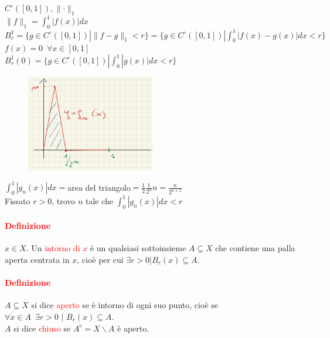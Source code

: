 \documentclass{article}
\begin{document}
$C^\circ([0,1]),\parallel\cdot\parallel_1$\\
$\parallel f\parallel_1=\int_{0}^{1}|f(x)|dx$\\
$B_r^1=\{ g\in C^\circ([0,1])| \parallel f-g\parallel_1 <r \}=\{g\in C^\circ([0,1])| \int_{0}^{1}|f(x)-g(x)|dx <r\}$\\
$f(x)=0\,\,\,\forall x \in [0,1]$\\
$B_r^1(0)=\{ g \in C^\circ([0,1])| \int_{0}^{1}|g(x)|dx <r \}$\\
\begin{figure}[h!]
    \centering
    \includegraphics[width=0.5\textwidth]{Screenshot from 2023-03-22 17-46-35.png}
\end{figure}
$\int_{0}^{1}|g_n(x)|dx=$area del triangolo$= \frac{1}{2}\frac{1}{2^n}n=\frac{n}{2^{n+1}}$\\
Fissato $r>0$, trovo $n$ tale che $\int_{0}^{1}|g_n(x)|dx<r$

\paragraph{\textcolor{red}{Definizione}}
$x\in X$. Un \textcolor{red}{intorno di $x$} è un qualsiasi sottoinsieme $A \subseteq X$ che contiene una palla aperta centrata in $x$, cioè per cui $\exists r >0 | B_r(x)\subseteq A.$

\paragraph{\textcolor{red}{Definizione}}
$A \subseteq X$ si dice \textcolor{red}{aperto} se è intorno di ogni suo punto, cioè se $\forall x \in A\,\,\, \exists r>0\,\,|\,\, B_r(x)\subseteq A$.\\
$A$ si dice \textcolor{red}{chiuso} se $A^c = X \backslash A$ è aperto.
\end{document}
